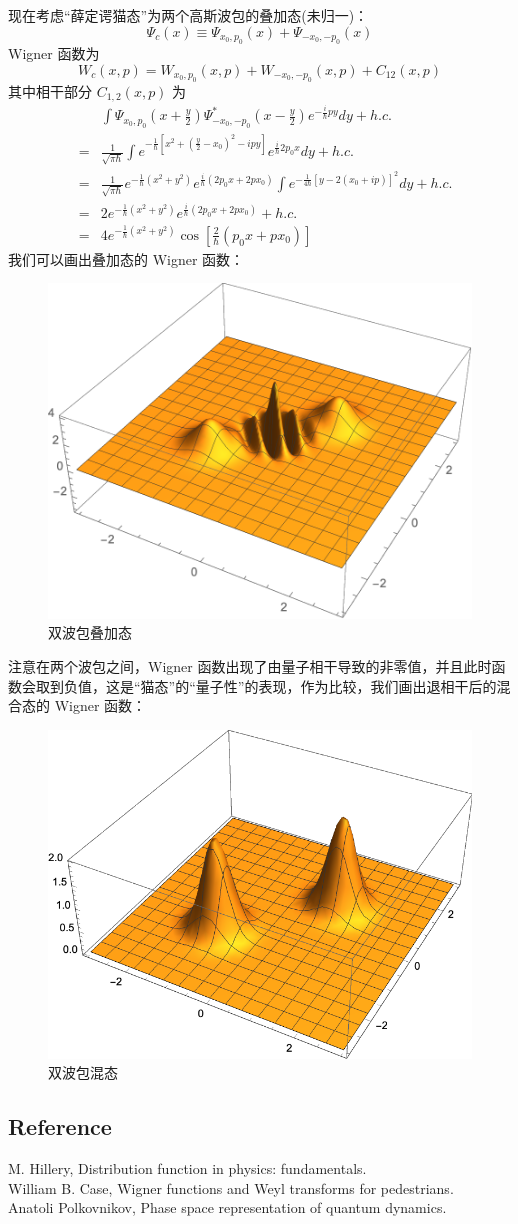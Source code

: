 \documentclass[10pt,UTF8]{ctexart}
\begin{document}
现在考虑“薛定谔猫态”为两个高斯波包的叠加态(未归一)：
\begin{equation}
	\Psi_c(x) \equiv \Psi_{x_0,p_0}(x)+\Psi_{-x_0,-p_0}(x) 
\end{equation}
Wigner 函数为
\begin{equation}
	W_c(x,p) = W_{x_0,p_0}(x,p) + W_{-x_0,-p_0}(x,p) + C_{12}(x,p)
\end{equation}
其中相干部分 $C_{1,2}(x,p)$ 为
\begin{eqnarray}
	&& \int \Psi_{x_0,p_0}\left(x+\frac{y}{2}\right) \Psi_{-x_0,-p_0}^{*}\left(x-\frac{y}{2}\right) e^{-\frac{i}{\hbar}py} dy + h.c. \nonumber \\
	&=& \frac{1}{\sqrt{\pi \hbar}}\int e^{-\frac{1}{\hbar}\left[x^2+\left(\frac{y}{2}-x_0\right)^2-ipy\right]} e^{\frac{i}{\hbar}2p_0x} dy + h.c. \nonumber \\
	&=& \frac{1}{\sqrt{\pi \hbar}} e^{-\frac{1}{\hbar}(x^2+y^2)}e^{\frac{i}{\hbar}(2p_0x+2px_0)} \int e^{-\frac{1}{4\hbar}[y-2(x_0+ip)]^2} dy +h.c. \nonumber \\
	&=& 2 e^{-\frac{1}{\hbar}(x^2+y^2)} e^{\frac{i}{\hbar}(2p_0x+2px_0)} +h.c. \nonumber \\
	&=& 4 e^{-\frac{1}{\hbar}(x^2+y^2)} \cos\left[\frac{2}{\hbar}(p_0x+px_0)\right]
\end{eqnarray}
我们可以画出叠加态的 Wigner 函数：
\begin{figure}[H]
\begin{centering}
\includegraphics[width=.4\linewidth]{include/cor}
\par\end{centering}
\caption{双波包叠加态}
\end{figure}
\noindent
注意在两个波包之间，Wigner 函数出现了由量子相干导致的非零值，并且此时函数会取到负值，这是“猫态”的“量子性”的表现，作为比较，我们画出退相干后的混合态的 Wigner 函数：
\begin{figure}[H]
\begin{centering}
\includegraphics[width=.4\linewidth]{include/mix}
\par\end{centering}
\caption{双波包混态}
\end{figure}


\subsection*{Reference}
\noindent
[1] M. Hillery, Distribution function in physics: fundamentals. \\
\noindent
[2] William B. Case, Wigner functions and Weyl transforms for pedestrians. \\
\noindent
[3] Anatoli Polkovnikov, Phase space representation of quantum dynamics.
\end{document}
